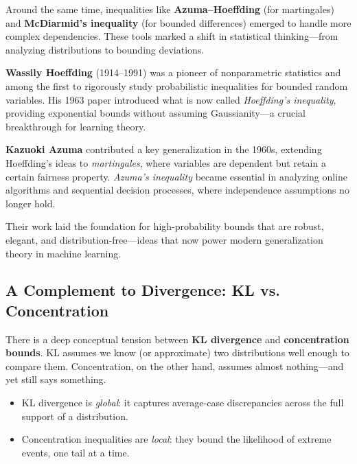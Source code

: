 Around the same time, inequalities like \textbf{Azuma–Hoeffding} (for martingales) and \textbf{McDiarmid’s inequality} (for bounded differences) emerged to handle more complex dependencies. These tools marked a shift in statistical thinking—from analyzing distributions to bounding deviations.

\begin{tcolorbox}[colback=blue!5!white, colframe=blue!50!black, title=Historical Sidebar: Wassily Hoeffding and Kazuoki Azuma]

    \textbf{Wassily Hoeffding} (1914–1991) was a pioneer of nonparametric statistics and among the first to rigorously study probabilistic inequalities for bounded random variables. His 1963 paper introduced what is now called \emph{Hoeffding’s inequality}, providing exponential bounds without assuming Gaussianity—a crucial breakthrough for learning theory.
    
    \medskip
    
    \textbf{Kazuoki Azuma} contributed a key generalization in the 1960s, extending Hoeffding’s ideas to \emph{martingales}, where variables are dependent but retain a certain fairness property. \emph{Azuma’s inequality} became essential in analyzing online algorithms and sequential decision processes, where independence assumptions no longer hold.
    
    \medskip
    
    Their work laid the foundation for high-probability bounds that are robust, elegant, and distribution-free—ideas that now power modern generalization theory in machine learning.
    
\end{tcolorbox}

\subsection{A Complement to Divergence: KL vs. Concentration}

There is a deep conceptual tension between \textbf{KL divergence} and \textbf{concentration bounds}. KL assumes we know (or approximate) two distributions well enough to compare them. Concentration, on the other hand, assumes almost nothing—and yet still says something.

\begin{itemize}
    \item KL divergence is \emph{global}: it captures average-case discrepancies across the full support of a distribution.
    \item Concentration inequalities are \emph{local}: they bound the likelihood of extreme events, one tail at a time.
\end{itemize}

